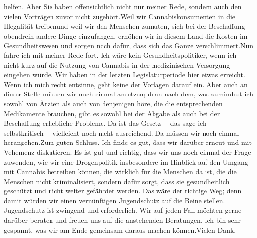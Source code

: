 \documentclass{article}
\begin{document}
helfen. Aber Sie haben offensichtlich nicht nur meiner Rede, sondern auch den vielen Vorträgen zuvor nicht zugehört.Weil wir Cannabiskonsumenten in die Illegalität treibenund weil wir den Menschen zumuten, sich bei der Beschaffung obendrein andere Dinge einzufangen, erhöhen wir in diesem Land die Kosten im Gesundheitswesen und sorgen noch dafür, dass sich das Ganze verschlimmert.Nun fahre ich mit meiner Rede fort. Ich wäre kein Gesundheitspolitiker, wenn ich nicht kurz auf die Nutzung von Cannabis in der medizinischen Versorgung eingehen würde. Wir haben in der letzten Legislaturperiode hier etwas erreicht. Wenn ich mich recht entsinne, geht keine der Vorlagen darauf ein. Aber auch an dieser Stelle müssen wir noch einmal ansetzen; denn nach dem, was zumindest ich sowohl von Ärzten als auch von denjenigen höre, die die entsprechenden Medikamente brauchen, gibt es sowohl bei der Abgabe als auch bei der Beschaffung erhebliche Probleme. Da ist das Gesetz – das sage ich selbstkritisch – vielleicht noch nicht ausreichend. Da müssen wir noch einmal herangehen.Zum guten Schluss. Ich finde es gut, dass wir darüber erneut und mit Vehemenz diskutieren. Es ist gut und richtig, dass wir uns noch einmal der Frage zuwenden, wie wir eine Drogenpolitik insbesondere im Hinblick auf den Umgang mit Cannabis betreiben können, die wirklich für die Menschen da ist, die die Menschen nicht kriminalisiert, sondern dafür sorgt, dass sie gesundheitlich geschützt und nicht weiter gefährdet werden. Das wäre der richtige Weg; denn damit würden wir einen vernünftigen Jugendschutz auf die Beine stellen. Jugendschutz ist zwingend und erforderlich. Wir auf jeden Fall möchten gerne darüber beraten und freuen uns auf die anstehenden Beratungen. Ich bin sehr gespannt, was wir am Ende gemeinsam daraus machen können.Vielen Dank.
\end{document}

